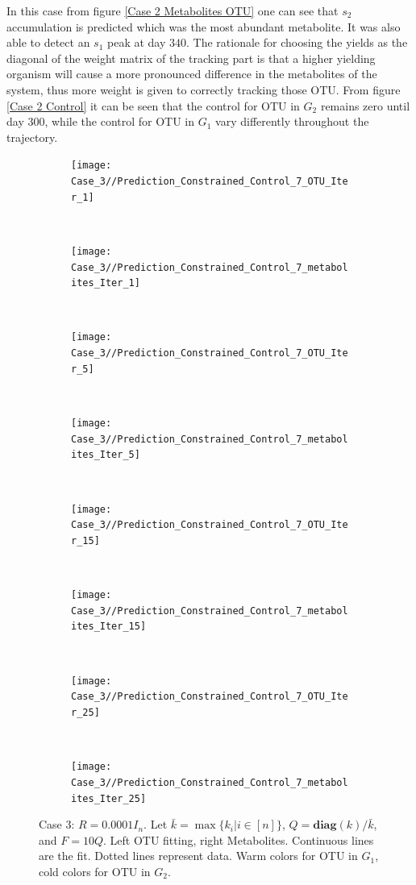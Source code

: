\documentclass[3p,times]{elsarticle}
\newcommand{\diag}{\textbf{diag}}
\begin{document}
In this case from figure \ref{Case 2 Metabolites OTU} one can see that $s_2$ accumulation is predicted which was the most abundant metabolite. It was also able to detect an $s_1$ peak at day $340$.  The rationale for choosing the yields as the diagonal of the weight matrix of the tracking part is that a higher yielding organism will cause a more pronounced difference in the metabolites of the system, thus more weight is given to correctly tracking those OTU. From figure \ref{Case 2 Control} it can be seen that the control for OTU in $G_2$ remains zero until day 300, while the control for OTU in $G_1$ vary differently throughout the trajectory.

\clearpage
\begin{figure}
	\centering
	\begin{subfigure}[b]{0.32\textheight}
		\texttt{[image: Case\_3//Prediction\_Constrained\_Control\_7\_OTU\_Iter\_1]}
	\end{subfigure}
	~
	\begin{subfigure}[b]{0.32\textheight}
		\texttt{[image: Case\_3//Prediction\_Constrained\_Control\_7\_metabolites\_Iter\_1]}
	\end{subfigure}
	~
	\begin{subfigure}[b]{0.32\textheight}
		\texttt{[image: Case\_3//Prediction\_Constrained\_Control\_7\_OTU\_Iter\_5]}
	\end{subfigure}
	~
	\begin{subfigure}[b]{0.32\textheight}
		\texttt{[image: Case\_3//Prediction\_Constrained\_Control\_7\_metabolites\_Iter\_5]}
	\end{subfigure}
	~
		\begin{subfigure}[b]{0.32\textheight}
		\texttt{[image: Case\_3//Prediction\_Constrained\_Control\_7\_OTU\_Iter\_15]}
	\end{subfigure}
	~
	\begin{subfigure}[b]{0.32\textheight}
		\texttt{[image: Case\_3//Prediction\_Constrained\_Control\_7\_metabolites\_Iter\_15]}
	\end{subfigure}
	~
	\begin{subfigure}[b]{0.32\textheight}
		\texttt{[image: Case\_3//Prediction\_Constrained\_Control\_7\_OTU\_Iter\_25]}
	\end{subfigure}
	~
	\begin{subfigure}[b]{0.32\textheight}
		\texttt{[image: Case\_3//Prediction\_Constrained\_Control\_7\_metabolites\_Iter\_25]}
	\end{subfigure}
\caption{Case 3: $R = 0.0001 I_n$. Let $\bar{k} =  \max \{k_i| i\in [n] \}$, $Q = \diag(k) /\bar{k}$, and $F = 10Q$. Left OTU fitting, right Metabolites. Continuous lines are the fit. Dotted lines represent data. Warm colors for OTU in $G_1$, cold colors for OTU in $G_2$.}
\label{Case 3 Metabolites OTU}
\end{figure}
\end{document}
